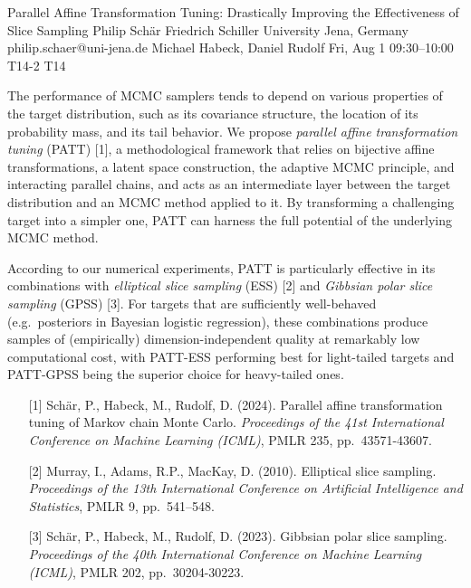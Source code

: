 \begin{talk}
\end{talk}

\begin{talk}
  {Parallel Affine Transformation Tuning: Drastically Improving the Effectiveness of Slice Sampling}%
  {Philip Schär}%
  {Friedrich Schiller University Jena, Germany}%
  {philip.schaer@uni-jena.de}%
  {Michael Habeck, Daniel Rudolf}%
  {}%
  {Fri, Aug 1 09:30–10:00}%
  {T14-2}%
  {T14}%
  

The performance of MCMC samplers tends to depend on various properties of the target distribution, such as its covariance structure, the location of its probability mass, and its tail behavior. We propose \textit{parallel affine transformation tuning} (PATT) [1], a methodological framework that relies on bijective affine transformations, a latent space construction, the adaptive MCMC principle, and interacting parallel chains, and acts as an intermediate layer between the target distribution and an MCMC method applied to it. By transforming a challenging target into a simpler one, PATT can harness the full potential of the underlying MCMC method.

According to our numerical experiments, PATT is particularly effective in its combinations with \textit{elliptical slice sampling} (ESS) [2] and \textit{Gibbsian polar slice sampling} (GPSS) [3]. For targets that are sufficiently well-behaved (e.g.~posteriors in Bayesian logistic regression), these combinations produce samples of (empirically) dimension-independent quality at remarkably low computational cost, with PATT-ESS performing best for light-tailed targets and PATT-GPSS being the superior choice for heavy-tailed ones.

\medskip

\begin{enumerate}
	\item[{[1]}] Schär, P., Habeck, M., Rudolf, D. (2024). Parallel affine transformation tuning of Markov chain Monte Carlo. \textit{Proceedings of the 41st International Conference on Machine Learning (ICML)}, PMLR 235, pp.~43571-43607.
	\item[{[2]}] Murray, I., Adams, R.P., MacKay, D. (2010). Elliptical slice sampling. \textit{Proceedings of the 13th International Conference on Artificial Intelligence and Statistics}, PMLR 9, pp.~541--548.
	\item[{[3]}] Schär, P., Habeck, M., Rudolf, D. (2023). Gibbsian polar slice sampling. \textit{Proceedings of the 40th International Conference on Machine Learning (ICML)}, PMLR 202, pp.~30204-30223.
\end{enumerate}

\end{talk}

